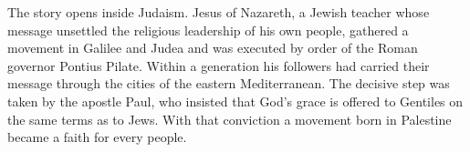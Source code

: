 \begin{partoverview}
The story opens inside Judaism. Jesus of Nazareth, a Jewish teacher whose message unsettled the
religious leadership of his own people, gathered a movement in Galilee and Judea and was executed by
order of the Roman governor Pontius Pilate. Within a generation his followers had carried their message
through the cities of the eastern Mediterranean. The decisive step was taken by the apostle Paul, who
insisted that God's grace is offered to Gentiles on the same terms as to Jews. With that conviction a
movement born in Palestine became a faith for every people.
\end{partoverview}
